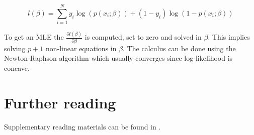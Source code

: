 \begin{equation}
    l\left(\beta\right)=\sum_{i=1}^{N}{{y_i\log{\left(p\left(x_i;\beta\right)\right)}+\left(1-y_i\right)\log{\left(1-p\left(x_i;\beta\right)\right)}}}
    \label{eq_LogisticRegression3}
\end{equation}

To get an MLE the $\frac{\partial l\left(\beta\right)}{\partial\beta}$ is computed, set to zero and solved in $\beta$. This implies solving $p+1$ non-linear equations in $\beta$. The calculus can be done using the Newton-Raphson algorithm which usually converges since log-likelihood is concave.

\section*{Further reading}
Supplementary reading materials can be found in \cite{Bramer2016}.


